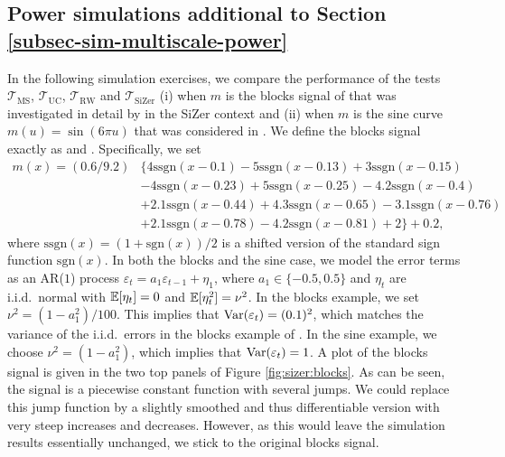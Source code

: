 \subsection*{Power simulations additional to Section \ref{subsec-sim-multiscale-power}}


In the following simulation exercises, we compare the performance of the tests $\mathcal{T}_{\text{MS}}$, $\mathcal{T}_{\text{UC}}$, $\mathcal{T}_{\text{RW}}$ and $\mathcal{T}_{\text{SiZer}}$ (i) when $m$ is the blocks signal of \cite{DonohoJohnstone1995} that was investigated in detail by \cite{HannigMarron2006} in the SiZer context and (ii) when $m$ is the sine curve $m(u) = \sin(6\pi u)$ that was considered in \cite{ParkHannigKang2009}. We define the blocks signal exactly as \cite{MarronAdakJohnstoneNeumannPatil1998} and \cite{HannigMarron2006}. Specifically, we set 
\begin{align*}
m(x) = (0.6/9.2) 
 & \big\{ 4 \text{ssgn}(x-0.1) - 5 \text{ssgn}(x-0.13) + 3 \text{ssgn}(x-0.15) \\ 
 & - 4 \text{ssgn}(x-0.23) + 5 \text{ssgn}(x-0.25) -4.2 \text{ssgn}(x-0.4) \\
 & + 2.1 \text{ssgn}(x-0.44) + 4.3 \text{ssgn} (x-0.65) - 3.1\text{ssgn}(x-0.76) \\
 & + 2.1 \text{ssgn}(x-0.78) - 4.2 \text{ssgn}(x-0.81) + 2 \big\} + 0.2,
\end{align*}
where $\text{ssgn}(x) = (1+\text{sgn}(x))/2$ is a shifted version of the standard sign function $\text{sgn}(x)$. In both the blocks and the sine case, we model the error terms as an AR($1$) process $\varepsilon_t = a_1 \varepsilon_{t-1} + \eta_1$, where $a_1 \in\{-0.5,0.5\}$ and $\eta_t$ are i.i.d.\ normal with $\mathbb{E}[\eta_t] = 0$ and $\mathbb{E}[\eta_t^2] = \nu^2$. In the blocks example, we set $\nu^2 = (1-a_1^2)/100$. This implies that $\textnormal{Var}(\varepsilon_t) = (0.1)^2$, which matches the variance of the i.i.d.\ errors in the blocks example of \cite{HannigMarron2006}. In the sine example, we choose $\nu^2 = (1-a_1^2)$, which implies that $\textnormal{Var}(\varepsilon_t) = 1$. A plot of the blocks signal is given in the two top panels of Figure \ref{fig:sizer:blocks}. As can be seen, the signal is a piecewise constant function with several jumps. We could replace this jump function by a slightly smoothed and thus differentiable version with very steep increases and decreases. However, as this would leave the simulation results essentially unchanged, we stick to the original blocks signal.  


